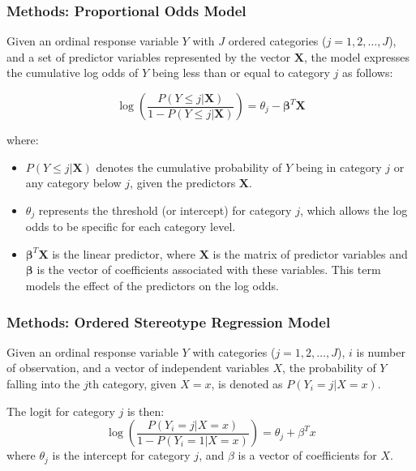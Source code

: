 \documentclass[xcolor=svgnames]{beamer}
\begin{document}
\begin{frame}\frametitle{Methods: Proportional Odds Model}

  Given an ordinal response variable $Y$ with $J$ ordered categories ($j=1, 2, \ldots, J$), 
  and a set of predictor variables represented by the vector $\mathbf{X}$, the model expresses 
  the cumulative log odds of $Y$ being less than or equal to category $j$ as follows:
  
  \[
  \log\left(\frac{P(Y \leq j | \mathbf{X})}{1 - P(Y \leq j | \mathbf{X})}\right) = \theta_j - \boldsymbol{\beta}^T\mathbf{X}
  \]
  
  where:
  {\small
    \begin{itemize}
        \item $P(Y \leq j | \mathbf{X})$ denotes the cumulative probability of $Y$ being in category $j$ or any category below $j$, given the predictors $\mathbf{X}$.
        \item $\theta_j$ represents the threshold (or intercept) for category $j$, which allows the log odds to be specific for each category level.
        \item $\boldsymbol{\beta}^T\mathbf{X}$ is the linear predictor, where $\mathbf{X}$ is the matrix of predictor variables and $\boldsymbol{\beta}$ is the vector of coefficients associated with these variables. This term models the effect of the predictors on the log odds.
    \end{itemize}
  }
  
  
\end{frame}


\begin{frame}\frametitle{Methods: Ordered Stereotype Regression Model}

  Given an ordinal response variable $Y$ with categories ($j=1, 2, \ldots, J$), $i$ is number of observation, and a vector of independent variables $X$, the probability of $Y$ falling into the $j$th category, given $X = x$, is denoted as $P(Y_i = j | X = x)$.

The logit for category $j$ is then:
\[
\log\left(\frac{P(Y_i = j | X = x)}{1 - P(Y_i = 1 | X = x)}\right) = \theta_j + \beta^T x
\]
where $\theta_j$ is the intercept for category $j$, and $\beta$ is a vector of coefficients for $X$.
  
\end{frame}

\end{document}
